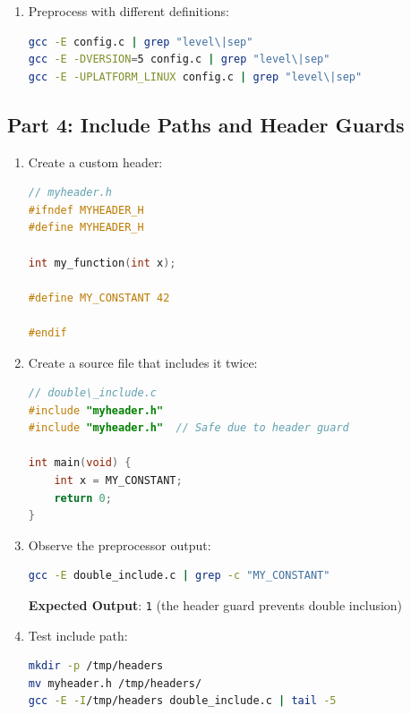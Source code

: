 \begin{experiment}
\begin{enumerate}
\begin{lstlisting}[language=C]
int main(void) {
    const char* level = FEATURE_LEVEL;
    char sep = PATH_SEPARATOR;
    return 0;
}
\end{lstlisting}

    \item Preprocess with different definitions:

\begin{lstlisting}[language=bash]
gcc -E config.c | grep "level\|sep"
gcc -E -DVERSION=5 config.c | grep "level\|sep"
gcc -E -UPLATFORM_LINUX config.c | grep "level\|sep"
\end{lstlisting}
\end{enumerate}

\subsection{Part 4: Include Paths and Header Guards}

\begin{enumerate}
    \item Create a custom header:

\begin{lstlisting}[language=C]
// myheader.h
#ifndef MYHEADER_H
#define MYHEADER_H

int my_function(int x);

#define MY_CONSTANT 42

#endif
\end{lstlisting}

    \item Create a source file that includes it twice:

\begin{lstlisting}[language=C]
// double\_include.c
#include "myheader.h"
#include "myheader.h"  // Safe due to header guard

int main(void) {
    int x = MY_CONSTANT;
    return 0;
}
\end{lstlisting}

    \item Observe the preprocessor output:

\begin{lstlisting}[language=bash]
gcc -E double_include.c | grep -c "MY_CONSTANT"
\end{lstlisting}

\textbf{Expected Output}: \texttt{1} (the header guard prevents double inclusion)

    \item Test include path:

\begin{lstlisting}[language=bash]
mkdir -p /tmp/headers
mv myheader.h /tmp/headers/
gcc -E -I/tmp/headers double_include.c | tail -5
\end{lstlisting}
\end{enumerate}


\end{experiment}
